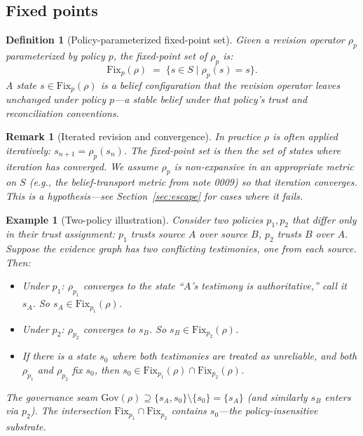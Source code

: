 \documentclass[11pt]{article}
\newtheorem{definition}{Definition}
\newtheorem{example}{Example}
\newtheorem{remark}{Remark}
\newcommand{\Gov}{\mathrm{Gov}}
\newcommand{\Fix}{\mathrm{Fix}}
\begin{document}
\subsection{Fixed points}

\begin{definition}[Policy-parameterized fixed-point set]
\label{def:fix-set}
Given a revision operator $\rho_p$ parameterized by policy $p$, the \emph{fixed-point set} of
$\rho_p$ is:
\[
  \Fix_p(\rho) \;=\; \{ s \in S \mid \rho_p(s) = s \}.
\]
A state $s \in \Fix_p(\rho)$ is a belief configuration that the revision operator leaves
unchanged under policy $p$---a stable belief under that policy's trust and reconciliation
conventions.
\end{definition}

\begin{remark}[Iterated revision and convergence]
In practice $\rho$ is often applied iteratively: $s_{n+1} = \rho_p(s_n)$. The fixed-point set
is then the set of states where iteration has converged. We assume $\rho_p$ is non-expansive
in an appropriate metric on $S$ (e.g., the belief-transport metric from note 0009) so that
iteration converges. This is a \emph{hypothesis}---see Section~\ref{sec:escape} for cases where
it fails.
\end{remark}

\begin{example}[Two-policy illustration]
\label{ex:two-policy}
Consider two policies $p_1, p_2$ that differ only in their trust assignment: $p_1$ trusts
source $A$ over source $B$, $p_2$ trusts $B$ over $A$. Suppose the evidence graph has two
conflicting testimonies, one from each source. Then:
\begin{itemize}
  \item Under $p_1$: $\rho_{p_1}$ converges to the state ``$A$'s testimony is authoritative,''
        call it $s_A$. So $s_A \in \Fix_{p_1}(\rho)$.
  \item Under $p_2$: $\rho_{p_2}$ converges to $s_B$. So $s_B \in \Fix_{p_2}(\rho)$.
  \item If there is a state $s_0$ where both testimonies are treated as unreliable, and both
        $\rho_{p_1}$ and $\rho_{p_2}$ fix $s_0$, then $s_0 \in \Fix_{p_1}(\rho) \cap
        \Fix_{p_2}(\rho)$.
\end{itemize}
The governance seam $\Gov(\rho) \supseteq \{s_A, s_0\} \setminus \{s_0\} = \{s_A\}$ (and
similarly $s_B$ enters via $p_2$). The intersection $\Fix_{p_1} \cap \Fix_{p_2}$ contains
$s_0$---the policy-insensitive substrate.
\end{example}
\end{document}
